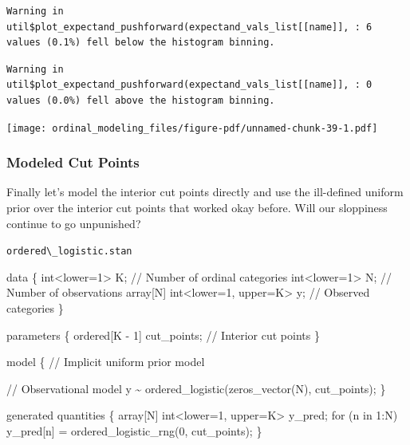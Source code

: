 \documentclass[
  letterpaper,
  DIV=11,
  numbers=noendperiod]{scrartcl}
\newenvironment{Shaded}{\begin{snugshade}}{\end{snugshade}}
\newcommand{\CommentTok}[1]{\textcolor[rgb]{0.37,0.37,0.37}{#1}}
\newcommand{\ControlFlowTok}[1]{\textcolor[rgb]{0.00,0.23,0.31}{#1}}
\newcommand{\DataTypeTok}[1]{\textcolor[rgb]{0.68,0.00,0.00}{#1}}
\newcommand{\DecValTok}[1]{\textcolor[rgb]{0.68,0.00,0.00}{#1}}
\newcommand{\KeywordTok}[1]{\textcolor[rgb]{0.00,0.23,0.31}{#1}}
\newcommand{\NormalTok}[1]{\textcolor[rgb]{0.00,0.23,0.31}{#1}}
\begin{document}
\begin{verbatim}
Warning in util$plot_expectand_pushforward(expectand_vals_list[[name]], : 6
values (0.1%) fell below the histogram binning.
\end{verbatim}

\begin{verbatim}
Warning in util$plot_expectand_pushforward(expectand_vals_list[[name]], : 0
values (0.0%) fell above the histogram binning.
\end{verbatim}

\texttt{[image: ordinal\_modeling\_files/figure-pdf/unnamed-chunk-39-1.pdf]}

\subsubsection{Modeled Cut Points}\label{modeled-cut-points-1}

Finally let's model the interior cut points directly and use the
ill-defined uniform prior over the interior cut points that worked okay
before. Will our sloppiness continue to go unpunished?

\begin{codelisting}

\caption{\texttt{ordered\textbackslash\_logistic.stan}}

\begin{Shaded}
\begin{Highlighting}[]
\KeywordTok{data}\NormalTok{ \{}
  \DataTypeTok{int}\NormalTok{\textless{}}\KeywordTok{lower}\NormalTok{=}\DecValTok{1}\NormalTok{\textgreater{} K;                   }\CommentTok{// Number of ordinal categories}
  \DataTypeTok{int}\NormalTok{\textless{}}\KeywordTok{lower}\NormalTok{=}\DecValTok{1}\NormalTok{\textgreater{} N;                   }\CommentTok{// Number of observations}
  \DataTypeTok{array}\NormalTok{[N] }\DataTypeTok{int}\NormalTok{\textless{}}\KeywordTok{lower}\NormalTok{=}\DecValTok{1}\NormalTok{, }\KeywordTok{upper}\NormalTok{=K\textgreater{} y; }\CommentTok{// Observed categories}
\NormalTok{\}}

\KeywordTok{parameters}\NormalTok{ \{}
  \DataTypeTok{ordered}\NormalTok{[K {-} }\DecValTok{1}\NormalTok{] cut\_points; }\CommentTok{// Interior cut points}
\NormalTok{\}}

\KeywordTok{model}\NormalTok{ \{}
  \CommentTok{// Implicit uniform prior model}

  \CommentTok{// Observational model}
\NormalTok{  y \textasciitilde{} ordered\_logistic(zeros\_vector(N), cut\_points);}
\NormalTok{\}}

\KeywordTok{generated quantities}\NormalTok{ \{}
  \DataTypeTok{array}\NormalTok{[N] }\DataTypeTok{int}\NormalTok{\textless{}}\KeywordTok{lower}\NormalTok{=}\DecValTok{1}\NormalTok{, }\KeywordTok{upper}\NormalTok{=K\textgreater{} y\_pred;}
  \ControlFlowTok{for}\NormalTok{ (n }\ControlFlowTok{in} \DecValTok{1}\NormalTok{:N)}
\NormalTok{    y\_pred[n] = ordered\_logistic\_rng(}\DecValTok{0}\NormalTok{, cut\_points);}
\NormalTok{\}}
\end{Highlighting}
\end{Shaded}

\end{codelisting}
\end{document}
